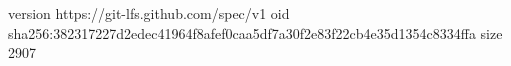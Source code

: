 version https://git-lfs.github.com/spec/v1
oid sha256:382317227d2edec41964f8afef0caa5df7a30f2e83f22cb4e35d1354c8334ffa
size 2907
